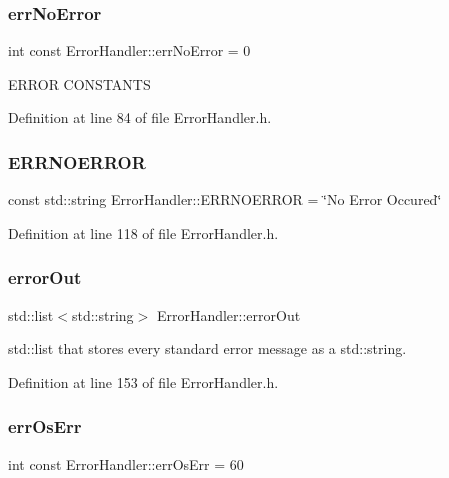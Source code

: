 \subsubsection{\texorpdfstring{errNoError}{errNoError}}
{\footnotesize\ttfamily int const Error\+Handler\+::err\+No\+Error = 0\hspace{0.3cm}{\ttfamily [static]}}

E\+R\+R\+OR C\+O\+N\+S\+T\+A\+N\+TS 

Definition at line 84 of file Error\+Handler.\+h.

\mbox{\label{classErrorHandler_ae805d5476c00a9687c15183268d4e2dd}} 
\subsubsection{\texorpdfstring{ERRNOERROR}{ERRNOERROR}}
{\footnotesize\ttfamily const std\+::string Error\+Handler\+::\+E\+R\+R\+N\+O\+E\+R\+R\+OR = \char`\"{}No Error Occured\char`\"{}\hspace{0.3cm}{\ttfamily [static]}}



Definition at line 118 of file Error\+Handler.\+h.

\mbox{\label{classErrorHandler_aeb3bff116fcb83a58defbef8e8111f0e}} 
\subsubsection{\texorpdfstring{errorOut}{errorOut}}
{\footnotesize\ttfamily std\+::list$<$std\+::string$>$ Error\+Handler\+::error\+Out\hspace{0.3cm}{\ttfamily [private]}}

std\+::list that stores every standard error message as a std\+::string. 

Definition at line 153 of file Error\+Handler.\+h.

\mbox{\label{classErrorHandler_ab216b4dc48424850bdf52da2f4273023}} 
\subsubsection{\texorpdfstring{errOsErr}{errOsErr}}
{\footnotesize\ttfamily int const Error\+Handler\+::err\+Os\+Err = 60\hspace{0.3cm}{\ttfamily [static]}}



